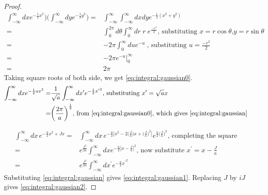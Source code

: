 \documentclass[]{article}
\begin{document}
\begin{proof}
	\begin{align*}
		\int_{-\infty}^{\infty} dx e^{-\frac{1}{2}x^2}\big)\big(\int_{-\infty}^{\infty} dy e^{-\frac{1}{2}y^2}\big) =& \int_{-\infty}^{\infty} \int_{-\infty}^{\infty} dx dy e^{-\frac{1}{2}(x^2+y^2)} \\
		=& \int_{0}^{2\pi} d\theta \int_{0}^{\infty}dr\;r\;e^\frac{-r^2}{2} \text{, substituting $x=r\cos{\theta}$,$y=r\sin{\theta}$}\\
		=&- 2\pi \int_{0}^{\infty}du e^{-u}\;\text{, substituting $u=\frac{-r^2}{2}$}\\
		=&- 2\pi e^{-u}\bigg\vert_0^\infty\\
		=& 2\pi
	\end{align*}
	Taking square roots of both side, we get \eqref{eq:integral:gaussian0}.
	\begin{align*}
		\int_{-\infty}^{\infty} dx e^{-\frac{1}{2}ax^2} =&\frac{1}{\sqrt{a}} \int_{-\infty}^{\infty} dx^\prime e^{-\frac{1}{2}{x^\prime}^2} \text{, substituting $x^\prime = \sqrt{a}x$} \\
		=& \bigg(\frac{2\pi}{a}\bigg)^\frac{1}{2} \text{, from \eqref{eq:integral:gaussian0}, 	which gives \eqref{eq:integral:gaussian}}
	\end{align*}

	\begin{align*}
		\int_{-\infty}^{\infty} dx\,e^{-\frac{a}{2} x^2+Jx}=&\int_{-\infty}^{\infty} dx\,e^{-\frac{a}{2} \big[x^2-2 \big(\frac{J}{a}\big)x+\big(\frac{J}{a}\big)^2\big]} e^{\frac{a}{2}\big(\frac{J}{a}\big)^2}\text{, completing the square}\\
		=&e^\frac{J^2}{2a}\int_{-\infty}^{\infty} dx e^{-\frac{a}{2} \big[x-\frac{J}{a}\big]^2} \text{, now substitute $x^\prime=x-\frac{J}{a}$}\\
		=&e^\frac{J^2}{2a}\int_{-\infty}^{\infty} dx^\prime e^{-\frac{a}{2} {x^\prime}^2}
	\end{align*}
	Substituting \eqref{eq:integral:gaussian} gives \eqref{eq:integral:gaussian1}. Replacing $J$ by $iJ$ gives \eqref{eq:integral:gaussian2}.
\end{proof}
\end{document}
